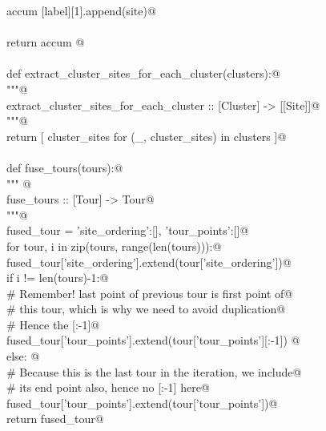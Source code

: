 \documentclass[11.5pt]{report}
\begin{document}
\begin{flushleft}
\begin{list}{}{}
\mbox{}\verb@                 accum [label][1].append(site)@\\
\mbox{}\verb@@\\
\mbox{}\verb@           return accum @\\
\mbox{}\verb@@\\
\mbox{}\verb@     def extract_cluster_sites_for_each_cluster(clusters):@\\
\mbox{}\verb@         """@\\
\mbox{}\verb@         extract_cluster_sites_for_each_cluster :: [Cluster] -> [[Site]]@\\
\mbox{}\verb@         """@\\
\mbox{}\verb@         return [ cluster_sites for (_, cluster_sites) in clusters  ]@\\
\mbox{}\verb@@\\
\mbox{}\verb@     def fuse_tours(tours):@\\
\mbox{}\verb@         """ @\\
\mbox{}\verb@          fuse_tours :: [Tour] -> Tour@\\
\mbox{}\verb@         """@\\
\mbox{}\verb@         fused_tour = {'site_ordering':[], 'tour_points':[]}@\\
\mbox{}\verb@         for tour, i in zip(tours, range(len(tours))):@\\
\mbox{}\verb@               fused_tour['site_ordering'].extend(tour['site_ordering'])@\\
\mbox{}\verb@               if i != len(tours)-1:@\\
\mbox{}\verb@                     # Remember! last point of previous tour is first point of@\\
\mbox{}\verb@                     # this tour, which is why we need to avoid duplication@\\
\mbox{}\verb@                     # Hence the [:-1]@\\
\mbox{}\verb@                     fused_tour['tour_points'].extend(tour['tour_points'][:-1]) @\\
\mbox{}\verb@               else: @\\
\mbox{}\verb@                     # Because this is the last tour in the iteration, we include@\\
\mbox{}\verb@                     # its end point also, hence no [:-1] here@\\
\mbox{}\verb@                     fused_tour['tour_points'].extend(tour['tour_points'])@\\
\mbox{}\verb@         return fused_tour@\\

\end{list}
\end{flushleft}
\end{document}
